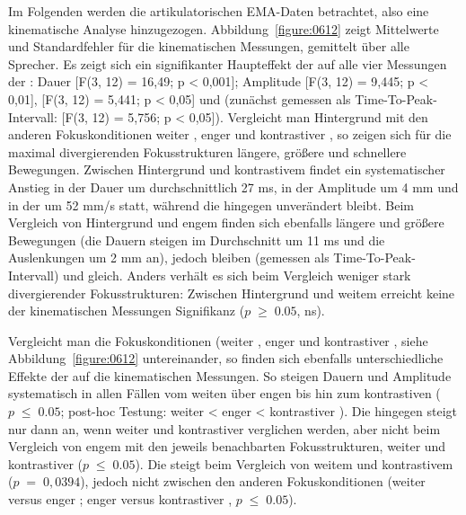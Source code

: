 Im Folgenden werden die artikulatorischen EMA-Daten betrachtet, also eine kinematische Analyse hinzugezogen. Abbildung~\ref{figure:0612} zeigt Mittelwerte und Standardfehler für die kinematischen Messungen, gemittelt über alle Sprecher. Es zeigt sich ein signifikanter Haupteffekt der  auf alle vier Messungen der : Dauer [F(3, 12) = 16,49; p < 0,001]; Amplitude [F(3, 12) = 9,445; p < 0,01],  [F(3, 12) = 5,441; p < 0,05] und  (zunächst gemessen als Time-To-Peak-Intervall: [F(3, 12) = 5,756; p < 0,05]). Vergleicht man Hintergrund mit den anderen Fokuskonditionen weiter , enger  und kontrastiver , so zeigen sich für die maximal divergierenden Fokusstrukturen längere, größere und schnellere Bewegungen. Zwischen Hintergrund und kontrastivem  findet ein systematischer Anstieg in der Dauer um durchschnittlich 27 ms, in der Amplitude um 4 mm und in der  um 52 mm/s statt, während die  hingegen unverändert bleibt. Beim Vergleich von Hintergrund und engem  finden sich ebenfalls längere und größere Bewegungen (die Dauern steigen im Durchschnitt um 11 ms und die Auslenkungen um 2 mm an), jedoch bleiben  (gemessen als Time-To-Peak-Intervall) und  gleich. Anders verhält es sich beim Vergleich weniger stark divergierender Fokusstrukturen: Zwischen Hintergrund und weitem  erreicht keine der kinematischen Messungen Signifikanz ($p\;\geq\;0.05$, ns).

 
Vergleicht man die Fokuskonditionen (weiter , enger  und kontrastiver , siehe Abbildung~\ref{figure:0612} untereinander, so finden sich ebenfalls unterschiedliche Effekte der  auf die kinematischen Messungen. So steigen Dauern und Amplitude systematisch in allen Fällen vom weiten über engen bis hin zum kontrastiven  ($p\;\leq\;0.05$; post-hoc Testung: weiter  < enger  < kontrastiver ). Die  hingegen steigt nur dann an, wenn weiter und kontrastiver  verglichen werden, aber nicht beim Vergleich von engem  mit den jeweils benachbarten Fokusstrukturen, weiter und kontrastiver  ($p\;\leq\;0.05$). Die  steigt beim Vergleich von weitem und kontrastivem  ($p\;=\;0,0394$), jedoch nicht zwischen den anderen Fokuskonditionen (weiter versus enger ; enger versus kontrastiver , $p\;\leq\;0.05$).

